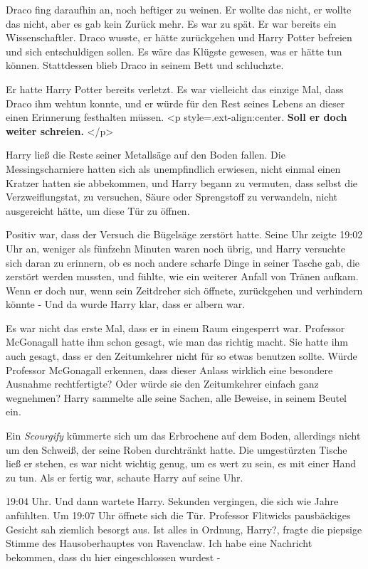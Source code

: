 Draco fing daraufhin an, noch heftiger zu weinen. Er wollte das nicht, er wollte
das nicht, aber es gab kein Zurück mehr. Es war zu spät. Er war bereits ein
Wissenschaftler. Draco wusste, er hätte zurückgehen und Harry Potter befreien
und sich entschuldigen sollen. Es wäre das Klügste gewesen, was er hätte tun
können. Stattdessen blieb Draco in seinem Bett und schluchzte.

Er hatte Harry Potter bereits verletzt. Es war vielleicht das einzige Mal, dass
Draco ihm wehtun konnte, und er würde für den Rest seines Lebens an dieser einen
Erinnerung festhalten müssen. <p style=\grqq{}.ext-align:center\grqq{}. \textbf{
Soll er doch weiter schreien. }</p>


Harry ließ die Reste seiner Metallsäge auf den Boden fallen. Die
Messingscharniere hatten sich als unempfindlich erwiesen, nicht einmal einen
Kratzer hatten sie abbekommen, und Harry begann zu vermuten, dass selbst die
Verzweiflungstat, zu versuchen, Säure oder Sprengstoff zu verwandeln, nicht
ausgereicht hätte, um diese Tür zu öffnen.

Positiv war, dass der Versuch die Bügelsäge zerstört hatte. Seine Uhr zeigte
19:02 Uhr an, weniger als fünfzehn Minuten waren noch übrig, und Harry versuchte
sich daran zu erinnern, ob es noch andere scharfe Dinge in seiner Tasche gab,
die zerstört werden mussten, und fühlte, wie ein weiterer Anfall von Tränen
aufkam. Wenn er doch nur, wenn sein Zeitdreher sich öffnete, zurückgehen und
verhindern könnte - Und da wurde Harry klar, dass er albern war.

Es war nicht das erste Mal, dass er in einem Raum eingesperrt war. Professor
McGonagall hatte ihm schon gesagt, wie man das richtig macht. Sie hatte ihm auch
gesagt, dass er den Zeitumkehrer nicht für so etwas benutzen sollte. Würde
Professor McGonagall erkennen, dass dieser Anlass wirklich eine besondere
Ausnahme rechtfertigte? Oder würde sie den Zeitumkehrer einfach ganz wegnehmen?
Harry sammelte alle seine Sachen, alle Beweise, in seinem Beutel ein.

Ein \emph{Scourgify} kümmerte sich um das Erbrochene auf dem Boden, allerdings
nicht um den Schweiß, der seine Roben durchtränkt hatte. Die umgestürzten Tische
ließ er stehen, es war nicht wichtig genug, um es wert zu sein, es mit einer
Hand zu tun. Als er fertig war, schaute Harry auf seine Uhr.

19:04 Uhr. Und dann wartete Harry. Sekunden vergingen, die sich wie Jahre
anfühlten. Um 19:07 Uhr öffnete sich die Tür. Professor Flitwicks pausbäckiges
Gesicht sah ziemlich besorgt aus. \glqq Ist alles in Ordnung, Harry?\grqq{},
fragte die piepsige Stimme des Hausoberhauptes von Ravenclaw. \glqq Ich habe
eine Nachricht bekommen, dass du hier eingeschlossen wurdest -\grqq{}